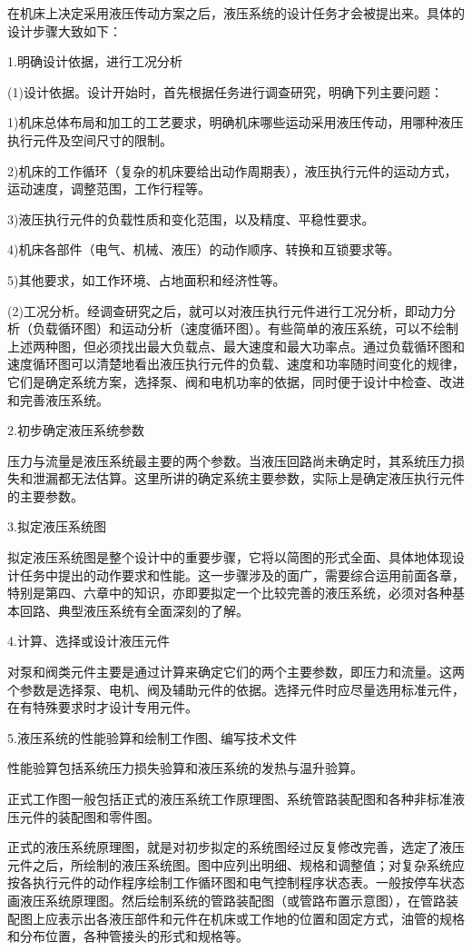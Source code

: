 在机床上决定采用液压传动方案之后，液压系统的设计任务才会被提出来。具体的设计步骤大致如下：

 1.明确设计依据，进行工况分析

(1)设计依据。设计开始时，首先根据任务进行调查研究，明确下列主要问题：

 1)机床总体布局和加工的工艺要求，明确机床哪些运动采用液压传动，用哪种液压执行元件及空间尺寸的限制。

 2)机床的工作循环（复杂的机床要给出动作周期表），液压执行元件的运动方式，运动速度，调整范围，工作行程等。

 3)液压执行元件的负载性质和变化范围，以及精度、平稳性要求。

 4)机床各部件（电气、机械、液压）的动作顺序、转换和互锁要求等。

 5)其他要求，如工作环境、占地面积和经济性等。

 (2)工况分析。经调查研究之后，就可以对液压执行元件进行工况分析，即动力分析（负载循环图）和运动分析（速度循环图）。有些简单的液压系统，可以不绘制上述两种图，但必须找出最大负载点、最大速度和最大功率点。通过负载循环图和速度循环图可以清楚地看出液压执行元件的负载、速度和功率随时间变化的规律，它们是确定系统方案，选择泵、阀和电机功率的依据，同时便于设计中检查、改进和完善液压系统。

 2.初步确定液压系统参数

压力与流量是液压系统最主要的两个参数。当液压回路尚未确定时，其系统压力损失和泄漏都无法估算。这里所讲的确定系统主要参数，实际上是确定液压执行元件的主要参数。

 3.拟定液压系统图

拟定液压系统图是整个设计中的重要步骤，它将以简图的形式全面、具体地体现设计任务中提出的动作要求和性能。这一步骤涉及的面广，需要综合运用前面各章，特别是第四、六章中的知识，亦即要拟定一个比较完善的液压系统，必须对各种基本回路、典型液压系统有全面深刻的了解。

 4.计算、选择或设计液压元件

 对泵和阀类元件主要是通过计算来确定它们的两个主要参数，即压力和流量。这两个参数是选择泵、电机、阀及辅助元件的依据。选择元件时应尽量选用标准元件，在有特殊要求时才设计专用元件。

 5.液压系统的性能验算和绘制工作图、编写技术文件

 性能验算包括系统压力损失验算和液压系统的发热与温升验算。

 正式工作图一般包括正式的液压系统工作原理图、系统管路装配图和各种非标准液压元件的装配图和零件图。

 正式的液压系统原理图，就是对初步拟定的系统图经过反复修改完善，选定了液压元件之后，所绘制的液压系统图。图中应列出明细、规格和调整值；对复杂系统应按各执行元件的动作程序绘制工作循环图和电气控制程序状态表。一般按停车状态画液压系统原理图。然后绘制系统的管路装配图（或管路布置示意图），在管路装配图上应表示出各液压部件和元件在机床或工作地的位置和固定方式，油管的规格和分布位置，各种管接头的形式和规格等。

